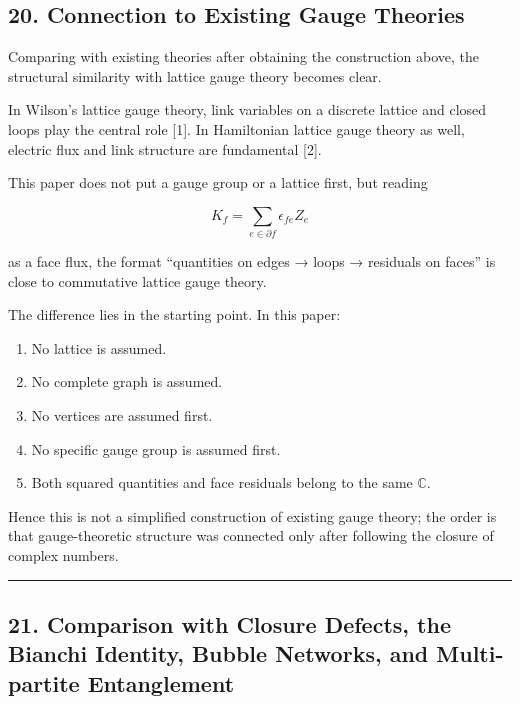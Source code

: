 \documentclass[
  a4paper,
]{article}
\providecommand{\tightlist}{%
  \setlength{\itemsep}{0pt}\setlength{\parskip}{0pt}}
\begin{document}
\subsection{20. Connection to Existing Gauge
Theories}\label{connection-to-existing-gauge-theories}

Comparing with existing theories after obtaining the construction above,
the structural similarity with lattice gauge theory becomes clear.

In Wilson's lattice gauge theory, link variables on a discrete lattice
and closed loops play the central role {[}1{]}. In Hamiltonian lattice
gauge theory as well, electric flux and link structure are fundamental
{[}2{]}.

This paper does not put a gauge group or a lattice first, but reading

\[
K_f=\sum_{e\in\partial f}\epsilon_{fe}Z_e
\]

as a face flux, the format ``quantities on edges → loops → residuals on
faces'' is close to commutative lattice gauge theory.

The difference lies in the starting point. In this paper:

\begin{enumerate}
\def\labelenumi{\arabic{enumi}.}
\tightlist
\item
  No lattice is assumed.
\item
  No complete graph is assumed.
\item
  No vertices are assumed first.
\item
  No specific gauge group is assumed first.
\item
  Both squared quantities and face residuals belong to the same
  \(\mathbb C\).
\end{enumerate}

Hence this is not a simplified construction of existing gauge theory;
the order is that gauge-theoretic structure was connected only after
following the closure of complex numbers.

\begin{center}\rule{0.5\linewidth}{0.5pt}\end{center}

\subsection{21. Comparison with Closure Defects, the Bianchi Identity,
Bubble Networks, and Multi-partite
Entanglement}\label{comparison-with-closure-defects-the-bianchi-identity-bubble-networks-and-multi-partite-entanglement}
\end{document}
